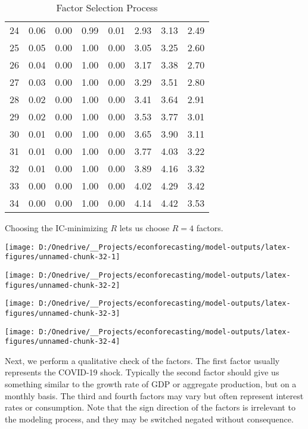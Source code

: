 \documentclass[11pt, letterpaper]{article}\usepackage[]{graphicx}\usepackage[]{color}
\begin{document}
\begin{table}[H]
\begin{tabular}{cccccccc}
   24 & 0.06 & 0.00 & 0.99 & 0.01 & 2.93 & 3.13 & 2.49 \\ 
   25 & 0.05 & 0.00 & 1.00 & 0.00 & 3.05 & 3.25 & 2.60 \\ 
   26 & 0.04 & 0.00 & 1.00 & 0.00 & 3.17 & 3.38 & 2.70 \\ 
   27 & 0.03 & 0.00 & 1.00 & 0.00 & 3.29 & 3.51 & 2.80 \\ 
   28 & 0.02 & 0.00 & 1.00 & 0.00 & 3.41 & 3.64 & 2.91 \\ 
   29 & 0.02 & 0.00 & 1.00 & 0.00 & 3.53 & 3.77 & 3.01 \\ 
   30 & 0.01 & 0.00 & 1.00 & 0.00 & 3.65 & 3.90 & 3.11 \\ 
   31 & 0.01 & 0.00 & 1.00 & 0.00 & 3.77 & 4.03 & 3.22 \\ 
   32 & 0.01 & 0.00 & 1.00 & 0.00 & 3.89 & 4.16 & 3.32 \\ 
   33 & 0.00 & 0.00 & 1.00 & 0.00 & 4.02 & 4.29 & 3.42 \\ 
   34 & 0.00 & 0.00 & 1.00 & 0.00 & 4.14 & 4.42 & 3.53 \\ 
   \hline
\end{tabular}
\endgroup
\caption{Factor Selection Process} 
\end{table}


Choosing the IC-minimizing $R$ lets us choose $R = 4$ factors.



{\centering \texttt{[image: D:/Onedrive/\_\_Projects/econforecasting/model-outputs/latex-figures/unnamed-chunk-32-1]} 

}




{\centering \texttt{[image: D:/Onedrive/\_\_Projects/econforecasting/model-outputs/latex-figures/unnamed-chunk-32-2]} 

}




{\centering \texttt{[image: D:/Onedrive/\_\_Projects/econforecasting/model-outputs/latex-figures/unnamed-chunk-32-3]} 

}




{\centering \texttt{[image: D:/Onedrive/\_\_Projects/econforecasting/model-outputs/latex-figures/unnamed-chunk-32-4]} 

}




Next, we perform a qualitative check of the factors. The first factor usually represents the COVID-19 shock. Typically the second factor should give us something similar to the growth rate of GDP or aggregate production, but on a monthly basis. The third and fourth factors may vary but often represent interest rates or consumption. Note that the sign direction of the factors is irrelevant to the modeling process, and they may be switched negated without consequence. 
\end{document}
